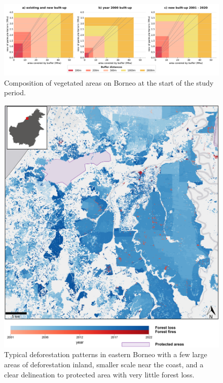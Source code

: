 \documentclass[
  letterpaper,
  DIV=11,
  numbers=noendperiod]{scrreprt}
\begin{document}
\begin{figure}

{\centering \includegraphics{text/../code/results/final_plots/op_buffer.png}

}

\caption{\label{fig-op_buffer}Composition of vegetated areas on Borneo
at the start of the study period.}

\end{figure}

\begin{figure}

{\centering \includegraphics[width=1\textwidth,height=\textheight]{text/../code/results/maps/deforestation_patterns.png}

}

\caption{\label{fig-mapdeforestation}Typical deforestation patterns in
eastern Borneo with a few large areas of deforestation inland, smaller
scale near the coast, and a clear delineation to protected area with
very little forest loss.}

\end{figure}
\end{document}
